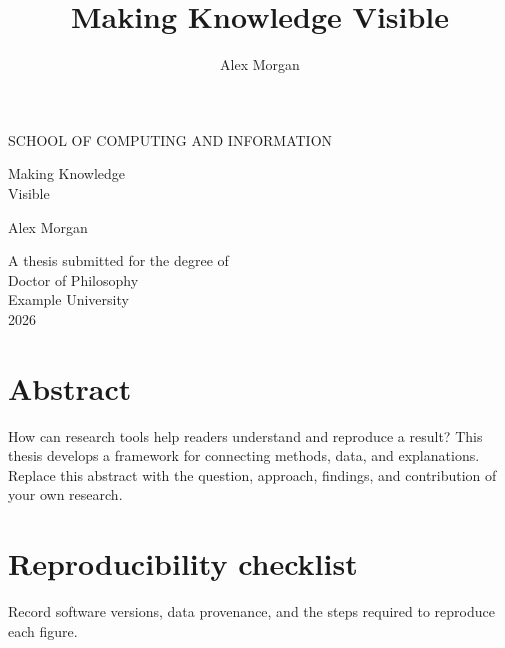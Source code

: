 \documentclass{mimosis}
\title{Making Knowledge Visible}\author{Alex Morgan}
\begin{document}
\frontmatter
\begin{titlepage}\centering\sffamily
{\small SCHOOL OF COMPUTING AND INFORMATION\par}
\vspace{32mm}{\color{MidnightBlue}\rule{28mm}{2pt}\par}\vspace{12mm}
{\fontsize{36}{42}\selectfont Making Knowledge\\Visible\par}
\vspace{10mm}{\Large Methods for open, reproducible research\par}
\vfill{\Large Alex Morgan\par}\vspace{8mm}
A thesis submitted for the degree of\\Doctor of Philosophy\\[10mm]Example University\\2026
\end{titlepage}
\chapter*{Abstract}
How can research tools help readers understand and reproduce a result? This thesis develops a framework for connecting methods, data, and explanations. Replace this abstract with the question, approach, findings, and contribution of your own research.
\tableofcontents
\mainmatter




\appendix\chapter{Reproducibility checklist}
Record software versions, data provenance, and the steps required to reproduce each figure.
\end{document}
